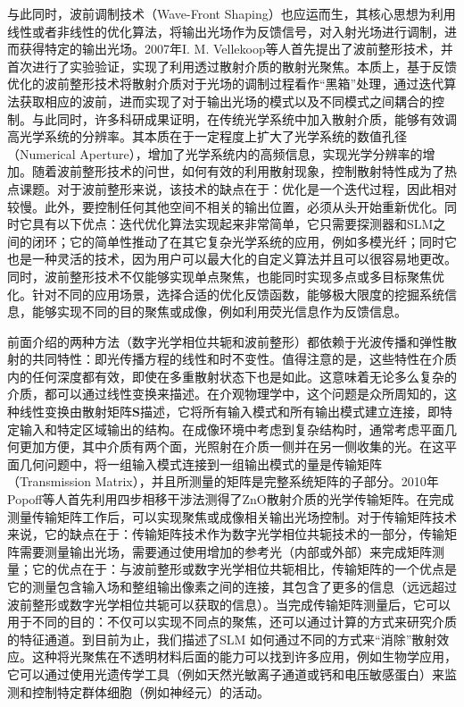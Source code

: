 与此同时，波前调制技术（Wave-Front Shaping）\cite{Vellekoop2007}也应运而生，其核心思想为利用线性或者非线性的优化算法，将输出光场作为反馈信号，对入射光场进行调制，进而获得特定的输出光场。2007年I. M. Vellekoop等人\cite{Vellekoop2007}首先提出了波前整形技术，并首次进行了实验验证，实现了利用透过散射介质的散射光聚焦。本质上，基于反馈优化的波前整形技术将散射介质对于光场的调制过程看作“黑箱”处理，通过迭代算法获取相应的波前，进而实现了对于输出光场的模式以及不同模式之间耦合的控制。与此同时，许多科研成果证明，在传统光学系统中加入散射介质，能够有效调高光学系统的分辨率\cite{vellekoop_exploiting_2010,choi_overcoming_2011}。其本质在于一定程度上扩大了光学系统的数值孔径（Numerical Aperture），增加了光学系统内的高频信息，实现光学分辨率的增加。随着波前整形技术的问世，如何有效的利用散射现象，控制散射特性成为了热点课题。对于波前整形来说，该技术的缺点在于：优化是一个迭代过程，因此相对较慢。此外，要控制任何其他空间不相关的输出位置，必须从头开始重新优化。同时它具有以下优点：迭代优化算法实现起来非常简单，它只需要探测器和SLM之间的闭环；它的简单性推动了在其它复杂光学系统的应用，例如多模光纤；同时它也是一种灵活的技术，因为用户可以最大化的自定义算法并且可以很容易地更改。同时，波前整形技术不仅能够实现单点聚焦，也能同时实现多点或多目标聚焦优化。针对不同的应用场景，选择合适的优化反馈函数，能够极大限度的挖掘系统信息，能够实现不同的目的聚焦或成像，例如利用荧光信息作为反馈信息\cite{boniface_non_invasive_2019}。

前面介绍的两种方法（数字光学相位共轭和波前整形）都依赖于光波传播和弹性散射的共同特性：即光传播方程的线性和时不变性。值得注意的是，这些特性在介质内的任何深度都有效，即使在多重散射状态下也是如此。这意味着无论多么复杂的介质，都可以通过线性变换来描述。在介观物理学中，这个问题是众所周知的，这种线性变换由散射矩阵$\mathbf{S}$描述，它将所有输入模式和所有输出模式建立连接，即特定输入和特定区域输出的结构。在成像环境中考虑到复杂结构时，通常考虑平面几何更加方便，其中介质有两个面，光照射在介质一侧并在另一侧收集的光。在这平面几何问题中，将一组输入模式连接到一组输出模式的量是传输矩阵（Transmission Matrix），并且所测量的矩阵是完整系统矩阵的子部分。2010年Popoff等人\cite{Popoff2010}首先利用四步相移干涉法测得了ZnO散射介质的光学传输矩阵。在完成测量传输矩阵工作后，可以实现聚焦或成像相关输出光场控制。对于传输矩阵技术来说，它的缺点在于：传输矩阵技术作为数字光学相位共轭技术的一部分，传输矩阵需要测量输出光场，需要通过使用增加的参考光（内部或外部）来完成矩阵测量；它的优点在于：与波前整形或数字光学相位共轭相比，传输矩阵的一个优点是它的测量包含输入场和整组输出像素之间的连接，其包含了更多的信息（远远超过波前整形或数字光学相位共轭可以获取的信息）。当完成传输矩阵测量后，它可以用于不同的目的：不仅可以实现不同点的聚焦，还可以通过计算的方式来研究介质的特征通道。到目前为止，我们描述了SLM 如何通过不同的方式来“消除”散射效应。这种将光聚焦在不透明材料后面的能力可以找到许多应用，例如生物学应用，它可以通过使用光遗传学工具（例如天然光敏离子通道或钙和电压敏感蛋白）来监测和控制特定群体细胞（例如神经元）的活动\cite{petreanu_channelrhodopsin-2assisted_2007}。

